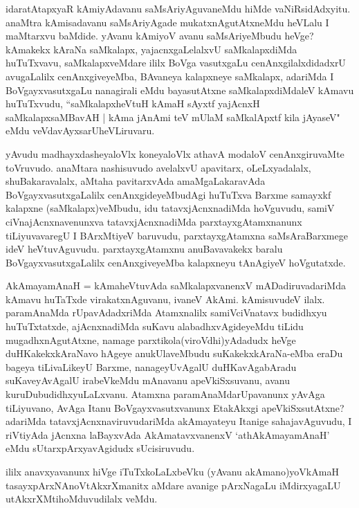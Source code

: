 \begin{artha}
idaratAtapxyaR \ndash  kAmiyAdavanu saMsAriyAguvaneMdu hiMde vaNiRsidAdxyitu. anaMtra kAmisadavanu saMsAriyAgade mukatxnAgutAtxneMdu heVLalu I maMtarxvu baMdide.
yAvanu kAmiyoV avanu saMsAriyeMbudu heVge? kAmakekx kAraNa saMkalapx, yajacnxgaLelalxvU saMkalapxdiMda huTuTxvavu, saMkalapxveMdare ililx BoVga vasutxgaLu cenAnxgilalxdidadxrU avugaLalilx cenAnxgiveyeMba, BAvaneya kalapxneye saMkalapx, adariMda I BoVgayxvasutxgaLu nanagirali eMdu bayasutAtxne saMkalapxdiMdaleV kAmavu huTuTxvudu, ``saMkalapxheVtuH kAmaH sAyxtf yajAcnxH saMkalapxsaMBavAH | kAma jAnAmi teV mUlaM saMkalApxtf kila jAyaseV" eMdu veVdavAyxsarU\break heVLiruvaru.
\end{artha}


\begin{artha}
yAvudu madhayxdasheyaloVlx koneyaloVlx athavA modaloV cenAnxgiruvaMte toVruvudo. anaMtara nashisuvudo avelalxvU apavitarx, oLeLxyadalalx, shuBakaravalalx, aMtaha pavitarxvAda amaMgaLakaravAda BoVgayxvasutxgaLalilx cenAnxgideyeMbudAgi huTuTxva Barxme samayxkf kalapxne (saMkalapx)veMbudu, idu tatavxjAcnxnadiMda hoVguvudu, samiV ciVnajAcnxnavenunxva tatavxjAcnxnadiMda parxtayxgAtamxnanunx tiLiyuvavaregU I BArxMtiyeV baruvudu, parxtayxgAtamxna saMsAraBarxmege ideV heVtuvAguvudu. parxtayxgAtamxnu anuBavavakekx baralu BoVgayxvasutxgaLalilx cenAnxgiveyeMba kalapxneyu tAnAgiyeV hoVgutatxde.
\end{artha}

\begin{artha}
AkAmayamAnaH = kAmaheVtuvAda saMkalapxvanenxV mADadiruvadariMda kAmavu huTaTxde virakatxnAguvanu, ivaneV AkAmi. kAmisuvudeV ilalx. paramAnaMda rUpavAdadxriMda Atamxnalilx samiVciVnatavx budidhxyu huTuTxtatxde, ajAcnxnadiMda suKavu alabadhxvAgideyeMdu tiLidu mugadhxnAgutAtxne, namage parxtikola(viroVdhi)yAdadudx heVge duHKakekxkAraNavo hAgeye anukUlaveMbudu suKakekxkAraNa-\break eMba eraDu bageya tiLivaLikeyU Barxme, nanageyUvAgalU duHKavAgabAradu suKaveyAvAgalU irabeVkeMdu mAnavanu apeVkiSxsuvanu, avanu kuruDubudidhxyuLaLxvanu. Atamxna paramAnaMdarUpavanunx yAvAga tiLiyuvano, AvAga Itanu BoVgayxvasutxvanunx EtakAkxgi apeVkiSxsutAtxne? adariMda tatavxjAcnxnaviruvudariMda akAmayateyu Itanige sahajavAguvudu, I riVtiyAda jAcnxna laBayxvAda AkAmatavxvanenxV `athAkAmayamAnaH' eMdu sUtarxpArxyavAgidudx sUcisiruvudu. 
\end{artha}

\begin{artha}
ililx anavxyavanunx hiVge iTuTxkoLaLxbeVku (yAvanu akAmano)\break yoV\s kAmaH tasayxpArxNAnoVtAkxrXmanitx aMdare avanige pArxNagaLu iMdirxyagaLU utAkxrXMtihoMduvudilalx veMdu.
\end{artha}

